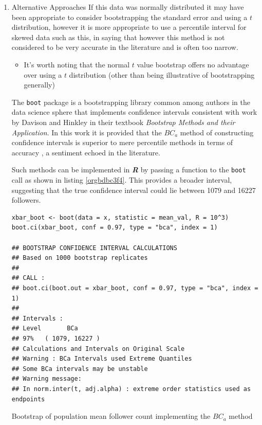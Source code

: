 \documentclass[11pt]{article}
\begin{document}
\begin{enumerate}
\item Alternative Approaches
\label{sec:org07b39bf}
If this data was normally distributed it may have been appropriate to consider
bootstrapping the standard error and using a \(t\) distribution, however it is more appropriate to use a
percentile interval for skewed data such as this, in saying that however this method is not considered to be very accurate in the literature and is often too narrow. \cite[Section 4.1]{hesterberg2015}

\begin{itemize}
\item It's worth noting that the normal \(t\) value bootstrap offers no advantage over
using a \(t\) distribution (other than being illustrative of bootstrapping
generally) \cite[Section 4.1]{hesterberg2015}
\end{itemize}


 The \texttt{boot} package is a bootstrapping library common among authors in the data science sphere
 \cite[p. 295]{james2013} \cite[p. 237]{wiley2019} that implements
 confidence intervals consistent with work by Davison and Hinkley
 \cite{ripley2020} in their textbook \emph{Bootstrap Methods and their Application}.
In this work it is provided that the \(BC_{a}\) method of constructing confidence
 intervals is  superior to mere percentile
 methods in terms of accuracy \cite[Ch. 5]{davison1997}, a sentiment echoed in the literature. \cite[Ch. 5]{carpenter2000,davison1997}

Such methods can be implemented in \textbf{\emph{R}} by passing a function to the \texttt{boot} call as shown in listing \ref{orgbdbc3f4}. This provides a broader interval, suggesting that the true confidence interval could lie between 1079 and 16227 followers.

\begin{listing}[htbp]
\begin{verbatim}
xbar_boot <- boot(data = x, statistic = mean_val, R = 10^3)
boot.ci(xbar_boot, conf = 0.97, type = "bca", index = 1)

## BOOTSTRAP CONFIDENCE INTERVAL CALCULATIONS
## Based on 1000 bootstrap replicates
##
## CALL :
## boot.ci(boot.out = xbar_boot, conf = 0.97, type = "bca", index = 1)
##
## Intervals :
## Level       BCa
## 97%   ( 1079, 16227 )
## Calculations and Intervals on Original Scale
## Warning : BCa Intervals used Extreme Quantiles
## Some BCa intervals may be unstable
## Warning message:
## In norm.inter(t, adj.alpha) : extreme order statistics used as endpoints
\end{verbatim}
\caption{\label{orgbdbc3f4}Bootstrap of population mean follower count implementing the \(BC_{a}\) method}
\end{listing}
\end{enumerate}
\end{document}

